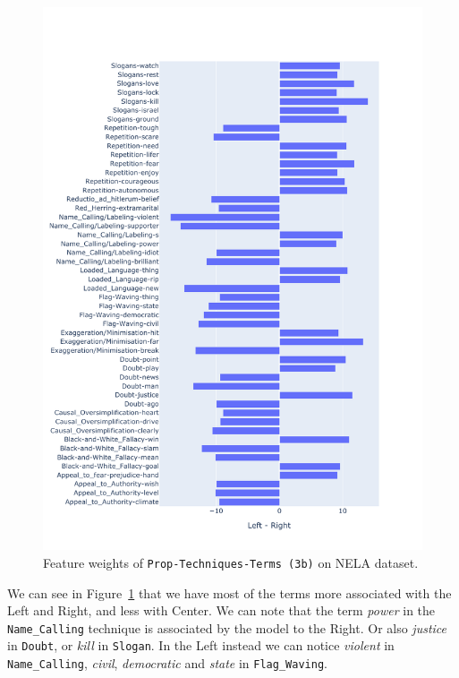 \begin{figure}[!htbp]
    \centering
    \includegraphics[trim={0 1cm 0 1cm},clip,width=\textwidth]{figures/nela_allsides_subset_media_balanced_weights_propaganda_techniques_tf_idf_2-simple.pdf}
    \caption{Feature weights of \texttt{Prop-Techniques-Terms (3b)} on NELA dataset.}
    \label{fig:nela_weights_prop_tech_terms}
\end{figure}

We can see in Figure~\ref{fig:nela_weights_prop_tech_terms} that we have most of the terms more associated with the Left and Right, and less with Center. We can note that the term \textit{power} in the \texttt{Name\_Calling} technique is associated by the model to the Right. Or also \textit{justice} in \texttt{Doubt}, or \textit{kill} in \texttt{Slogan}.
In the Left instead we can notice \textit{violent} in \texttt{Name\_Calling}, \textit{civil}, \textit{democratic} and \textit{state} in \texttt{Flag\_Waving}.



